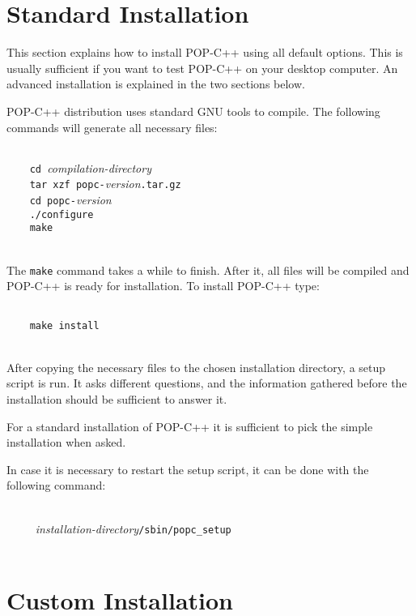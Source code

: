 \section{Standard Installation}

This section explains how to install POP-C++ using all default options. This is usually sufficient 
if you want to test POP-C++ on your desktop computer. An advanced installation is explained in the two sections below.

POP-C++ distribution uses standard GNU tools to compile. The following
commands will generate all necessary files:

\texttt{~\\
~~~~cd }\textit{compilation-directory}\texttt{\\
~~~~tar xzf popc-}\textit{version}\texttt{.tar.gz\\
~~~~cd popc-}\textit{version}\texttt{\\
~~~~./configure\\
~~~~make} \\
~

The \texttt{make} command takes a while to finish. After it, all files
will be compiled and POP-C++ is ready for installation. To install
POP-C++ type:

\texttt{~\\
~~~~make install} \\
~

After copying the necessary files to the chosen installation directory,
a setup script is run. It asks different questions, and the information
gathered before the installation should be sufficient to answer it.

For a standard installation of POP-C++ it is sufficient to pick the simple installation when asked.

In case it is necessary to restart the setup script, it can be done
with the following command:

\textit{~\\
~~~~~installation-directory}\texttt{/sbin/popc\_setup}\\
~


\section{Custom Installation}

